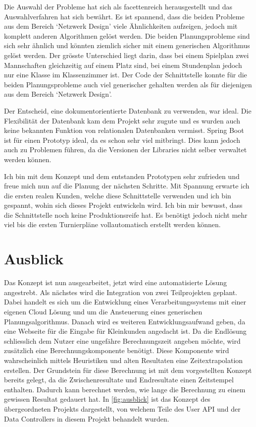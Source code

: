 Die Auswahl der Probleme hat sich als facettenreich herausgestellt und das Auswahlverfahren hat sich bewährt. Es ist spannend, dass die beiden Probleme aus dem Bereich `Netzwerk Design' 
viele Ähnlichkeiten aufzeigen, jedoch mit komplett anderen Algorithmen gelöst werden. Die beiden Planungsprobleme sind sich sehr ähnlich und könnten ziemlich sicher mit einem generischen 
Algorithmus gelöst werden. Der grösste Unterschied liegt darin, dass bei einem Spielplan zwei Mannschaften gleichzeitig auf einem Platz sind, bei einem 
Stundenplan jedoch nur eine Klasse im Klassenzimmer ist. Der Code der Schnittstelle konnte für die beiden Planungsprobleme auch viel generischer gehalten werden als für diejenigen aus dem Bereich 
`Netzwerk Design'.

Der Entscheid, eine dokumentorientierte Datenbank zu verwenden, war ideal. Die Flexibilität der Datenbank kam dem Projekt sehr zugute und es wurden auch keine bekannten Funktion von relationalen 
Datenbanken vermisst. Spring Boot ist für einen Prototyp ideal, da es schon sehr viel mitbringt. Dies kann jedoch auch zu Problemen führen, da die Versionen der Libraries nicht selber verwaltet 
werden können. 

Ich bin mit dem Konzept und dem entstanden Prototypen sehr zufrieden und freue mich nun auf die Planung der nächsten Schritte. Mit Spannung erwarte ich die ersten realen Kunden, welche diese 
Schnittstelle verwenden und ich bin gespannt, wohin sich dieses Projekt entwickeln wird. Ich bin mir bewusst, dass die Schnittstelle noch keine Produktionsreife hat. Es benötigt jedoch nicht mehr viel bis die 
ersten Turnierpläne vollautomatisch erstellt werden können.

\section{Ausblick}\label{fazit_ausblick}

Das Konzept ist nun ausgearbeitet, jetzt wird eine automatisierte Lösung angestrebt. Als nächstes wird die Integration von zwei Teilprojekten geplant. Dabei handelt es sich um die Entwicklung eines 
Verarbeitungssystems mit einer eigenen Cloud Lösung und um die Ansteuerung eines generischen Planungsalgorithmus. Danach wird es weiteren Entwicklungsaufwand geben, da eine 
Webseite für die Eingabe für Kleinkunden angedacht ist. Da die Endlösung schliesslich dem Nutzer eine ungefähre Berechnungszeit angeben möchte, wird zusätzlich eine Berechnungskomponente 
benötigt. Diese Komponente wird wahrscheinlich mittels Heuristiken und alten Resultaten eine Zeitextrapolation erstellen. Der Grundstein für diese Berechnung ist mit dem vorgestellten Konzept 
bereits gelegt, da die Zwischenresultate und Endresultate einen Zeitstempel enthalten. Dadurch kann berechnet werden, wie lange die Berechnung zu einem gewissen Resultat gedauert hat. In 
\autoref{fig:ausblick} ist das Konzept des übergeordneten Projekts dargestellt, von welchem Teile des User API und der Data Controllers in diesem Projekt behandelt wurden.

